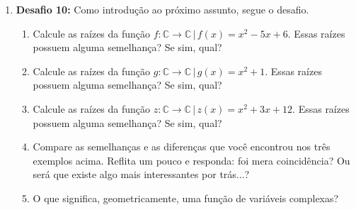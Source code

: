 \documentclass[a4paper, 11pt]{article}
\begin{document}
\begin{enumerate}
\item \textbf{Desafio 10:} Como introdução ao próximo assunto, segue o desafio.
	\begin{enumerate}
	\item Calcule as raízes da função $f: \mathbb{C} \longrightarrow \mathbb{C} \, | \, f(x) = x^2 -5x + 6$. Essas raízes possuem alguma semelhança? Se sim, qual?
	\item Calcule as raízes da função $g: \mathbb{C} \longrightarrow \mathbb{C} \, | \, g(x) = x^2 + 1$. Essas raízes possuem alguma semelhança? Se sim, qual?
	\item Calcule as raízes da função $z: \mathbb{C} \longrightarrow \mathbb{C} \, | \, z(x) = x^2 + 3x + 12$. Essas raízes possuem alguma semelhança? Se sim, qual?
	\item Compare as semelhanças e as diferenças que você encontrou nos três exemplos acima. Reflita um pouco e responda: foi mera coincidência? Ou será que existe algo mais interessantes por trás...?
	\item O que significa, geometricamente, uma função de variáveis complexas?
	\end{enumerate}















\end{enumerate}
\end{document}
